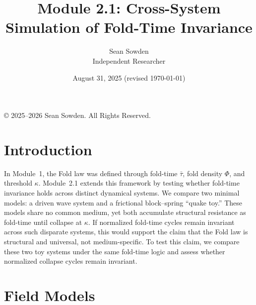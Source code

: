 \documentclass[12pt]{article}
\title{Module 2.1: Cross-System Simulation of Fold-Time Invariance}
\author{Sean Sowden \\ \small Independent Researcher}
\date{August 31, 2025 (revised \today)}
\begin{document}
\maketitle
\begin{center}
    \begingroup\small
\noindent © 2025--2026 Sean Sowden. All Rights Reserved.
\par\endgroup

\end{center}

\setcounter{section}{0}
\setcounter{secnumdepth}{2} %
\setcounter{tocdepth}{2}    %
\renewcommand{\thesection}{2.1.\arabic{section}}
\renewcommand{\thesubsection}{2.1.\arabic{section}.\arabic{subsection}}
\renewcommand{\thesubsubsection}{2.1.\arabic{section}.\arabic{subsection}.\arabic{subsubsection}}
\section{Introduction}
In Module~1, the Fold law was defined through fold-time $\bar{\tau}$, fold density $\Phi$, and threshold $\kappa$. Module~2.1 extends this framework by testing whether fold-time invariance holds across distinct dynamical systems. We compare two minimal models: a driven wave system and a frictional block--spring ``quake toy.'' These models share no common medium, yet both accumulate structural resistance as fold-time until collapse at $\kappa$. If normalized fold-time cycles remain invariant across such disparate systems, this would support the claim that the Fold law is structural and universal, not medium-specific. To test this claim, we compare these two toy systems under the same fold-time logic and assess whether normalized collapse cycles remain invariant.
\section{Field Models}
\end{document}
